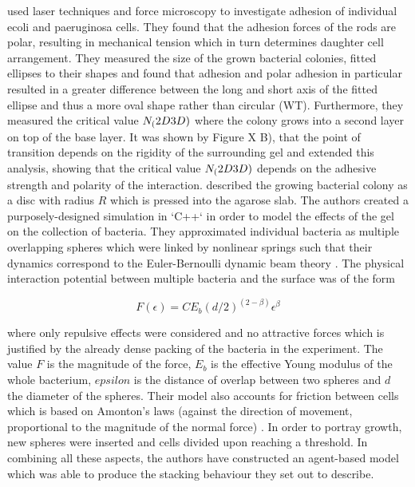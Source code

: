 \documentclass{article}
\begin{document}
\cite{Duvernoy2018} used laser techniques and force microscopy to investigate adhesion of individual \ac{ecoli} and \ac{paeruginosa} cells.
They found that the adhesion forces of the rods are polar, resulting in mechanical tension which in turn determines daughter cell arrangement.
They measured the size of the grown bacterial colonies, fitted ellipses to their shapes and found that adhesion and polar adhesion in particular resulted in a greater difference between the long and short axis of the fitted ellipse and thus a more oval shape rather than circular (WT).
Furthermore, they measured the critical value $N_(2D\/3D)$ where the colony grows into a second layer on top of the base layer.
It was shown by \cite{Grant2014} Figure X B), that the point of transition depends on the rigidity of the surrounding gel and \cite{Duvernoy2018} extended this analysis, showing that the critical value $N_(2D\/3D)$ depends on the adhesive strength and polarity of the interaction.
\cite{Grant2014} described the growing bacterial colony as a disc with radius $R$ which is pressed into the agarose slab.
The authors created a purposely-designed simulation in `C++` in order to model the effects of the gel on the collection of bacteria.
They approximated individual bacteria as multiple overlapping spheres which were linked by nonlinear springs such that their dynamics correspond to the Euler-Bernoulli dynamic beam theory \cite{HAN1999}.
The physical interaction potential between multiple bacteria and the surface was of the form

\begin{equation}
    F(\epsilon) = C E_b (d/2)^(2 - \beta) \epsilon^\beta
\end{equation}

where only repulsive effects were considered and no attractive forces which is justified by the already dense packing of the bacteria in the experiment.
The value $F$ is the magnitude of the force, $E_b$ is the effective Young modulus of the whole bacterium, $epsilon$ is the distance of overlap between two spheres and $d$ the diameter of the spheres.
Their model also accounts for friction between cells which is based on Amonton's laws (against the direction of movement, proportional to the magnitude of the normal force) \cite{Hutchings2021}.
In order to portray growth, new spheres were inserted and cells divided upon reaching a threshold.
In combining all these aspects, the authors have constructed an agent-based model which was able to produce the stacking behaviour they set out to describe.
\end{document}
